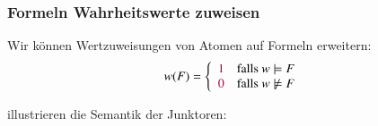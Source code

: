 \documentclass[aspectratio=1610,onlymath]{beamer}
\begin{document}
\begin{frame}\frametitle{Formeln Wahrheitswerte zuweisen}

Wir können Wertzuweisungen von Atomen auf Formeln erweitern:
\[ w(F)=\left\{\begin{array}{rl}\textcolor{purple}{1} & \text{falls } w\models F\\
\textcolor{purple}{0} & \text{falls } w\not\models F
\end{array}\right.\]\pause

 illustrieren die Semantik der Junktoren:\medskip

\medskip


\end{frame}
\end{document}
